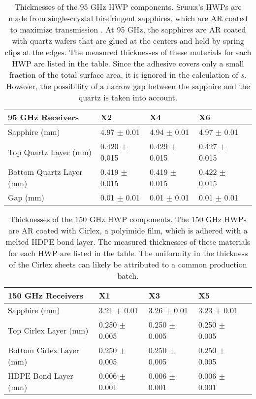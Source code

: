 \documentclass[twocolumn]{aastex61}
\begin{document}
\begin{table*}
\begin{center}
    \begin{tabular}{*5l} 
    \toprule
    95 GHz Receivers & X2 & X4 & X6 \\ \midrule
    Sapphire (mm) & 4.97 $\pm$ 0.01  & 4.94 $\pm$ 0.01 & 4.97 $\pm$ 0.01 \\ 
    Top Quartz Layer (mm) & 0.420 $\pm$ 0.015 & 0.429 $\pm$ 0.015 & 0.427 $\pm$ 0.015 \\ 
    Bottom Quartz Layer (mm)  & 0.419 $\pm$ 0.015 & 0.419 $\pm$ 0.015 & 0.422 $\pm$ 0.015 \\
    Gap (mm) & 0.01 $\pm$ 0.01 & 0.01 $\pm$ 0.01  & 0.01 $\pm$ 0.01 \\
    \bottomrule
    \end{tabular}
    \caption{Thicknesses of the 95 GHz HWP components. \textsc{Spider}'s HWPs are made from single-crystal birefringent sapphires, which are AR coated to maximize transmission \citep{Sean_thesis}. At 95 GHz, the sapphires are AR coated with quartz wafers that are glued at the centers and held by spring clips at the edges.  The measured thicknesses of these materials for each HWP are listed in the table.  Since the adhesive covers only a small fraction of the total surface area, it is ignored in the calculation of $s$.  However, the possibility of a narrow gap between the sapphire and the quartz is taken into account.}
    \label{table: HWP_table_90}
\end{center}
\end{table*}

\begin{table*}
\begin{center}
    \begin{tabular}{ *5l } 
    \toprule
    150 GHz Receivers & X1 & X3 & X5 \\ \midrule
    Sapphire (mm) & 3.21 $\pm$ 0.01  & 3.26 $\pm$ 0.01 & 3.23 $\pm$ 0.01 \\ 
    Top Cirlex Layer (mm) &	0.250 $\pm$ 0.005 & 0.250 $\pm$ 0.005 & 0.250 $\pm$ 0.005 \\ 
    Bottom Cirlex Layer (mm)  & 0.250 $\pm$ 0.005 & 0.250 $\pm$ 0.005 & 0.250 $\pm$ 0.005 \\
    HDPE Bond Layer (mm) & 0.006 $\pm$ 0.001 & 0.006 $\pm$ 0.001  & 0.006 $\pm$ 0.001 \\
    \bottomrule
    \end{tabular}
    \caption{Thicknesses of the 150 GHz HWP components. The 150 GHz HWPs are AR coated with Cirlex, a polyimide film, which is adhered with a melted HDPE bond layer.  The measured thicknesses of these materials for each HWP are listed in the table.  The uniformity in the thickness of the Cirlex sheets can likely be attributed to a common production batch.}
    \label{table: HWP_table_150}
\end{center}
\end{table*}
\end{document}
